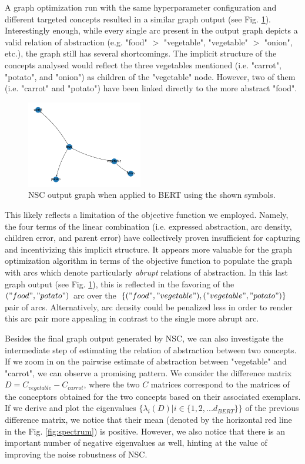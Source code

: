 A graph optimization run with the same hyperparameter configuration and different targeted concepts resulted in a similar graph output (see Fig. \ref{fig:valuable}). Interestingly enough, while every single arc present in the output graph depicts a valid relation of abstraction (e.g. "food" $>$ "vegetable", "vegetable" $>$ "onion", etc.), the graph still has several shortcomings. The implicit structure of the concepts analysed would reflect the three vegetables mentioned (i.e. "carrot", "potato", and "onion") as children of the "vegetable" node. However, two of them (i.e. "carrot" and "potato") have been linked directly to the more abstract "food".

\begin{figure}[h]
    \centering
    \includegraphics[width=0.45\textwidth]{img/valuable contrasts.png}
    \caption{NSC output graph when applied to BERT using the shown symbols.}\label{fig:valuable}
\end{figure}

This likely reflects a limitation of the objective function we employed. Namely, the four terms of the linear combination (i.e. expressed abstraction, arc density, children error, and parent error) have collectively proven insufficient for capturing and incentivizing this implicit structure. It appears more valuable for the graph optimization algorithm in terms of the objective function to populate the graph with arcs which denote particularly \textit{abrupt} relations of abstraction. In this last graph output (see Fig. \ref{fig:valuable}), this is reflected in the favoring of the $("food", "potato")$ arc over the $\{("food", "vegetable"), ("vegetable", "potato")\}$ pair of arcs. Alternatively, arc density could be penalized less in order to render this arc pair more appealing in contrast to the single more abrupt arc.

Besides the final graph output generated by NSC, we can also investigate the intermediate step of estimating the relation of abstraction between two concepts. If we zoom in on the pairwise estimate of abstraction between "vegetable" and "carrot", we can observe a promising pattern. We consider the difference matrix $D = C_{vegetable} - C_{carrot}$, where the two $C$ matrices correspond to the matrices of the conceptors obtained for the two concepts based on their associated exemplars. If we derive and plot the eigenvalues $\{\lambda_{i}(D)|i \in \{1, 2, ... d_{BERT}\}\}$ of the previous difference matrix, we notice that their mean (denoted by the horizontal red line in the Fig. \ref{fig:spectrum}) is positive. However, we also notice that there is an important number of negative eigenvalues as well, hinting at the value of improving the noise robustness of NSC.

